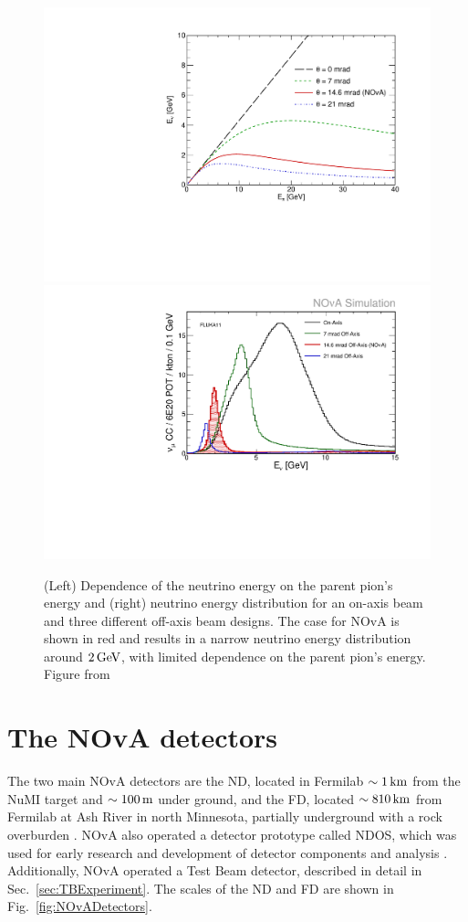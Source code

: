 \begin{figure}[!htb]  
  \centering
  \includegraphics*[width=.48\textwidth]{Plots/NOvAExperiment/PionOffAxis.pdf}
  \noindent\centering
  \includegraphics*[width=.51\textwidth]{Plots/NOvAExperiment/OffAxisFluxPionEmbedded.pdf}
  \caption[The NOvA off-axis beam concept]{(Left) Dependence of the neutrino energy on the parent pion's energy and (right) neutrino energy distribution for an on-axis beam and three different off-axis beam designs. The case for \acrshort{NOvA} is shown in red and results in a narrow neutrino energy distribution around $\unit[2]{GeV}$, with limited dependence on the parent pion's energy. Figure from \cite{NOvATechreport.pdf}}
 \label{fig:NOvAOffAxis}
\end{figure}

\section{The NOvA detectors}\label{sec:NOvADetectors}

The two main \gls{NOvA} detectors are the \gls{ND}, located in \gls{Fermilab} $\sim\unit[1]{km}$ from the \gls{NuMI} target and $\sim\unit[100]{m}$ under ground, and the \gls{FD}, located $\sim\unit[810]{km}$ from \gls{Fermilab} at Ash River in north Minnesota, partially underground with a rock overburden \cite{NOvATechreport.pdf}. \gls{NOvA} also operated a detector prototype called \gls{NDOS}, which was used for early research and development of detector components and analysis \cite{NOvAStatusAndOutlook.pdf}. Additionally, \gls{NOvA} operated a Test Beam detector, described in detail in Sec.~\ref{sec:TBExperiment}. The scales of the \gls{ND} and \gls{FD} are shown in Fig.~\ref{fig:NOvADetectors}.

